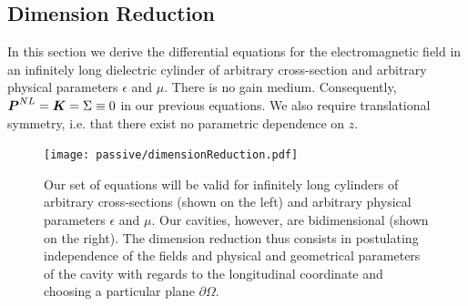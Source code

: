 \subsection{Dimension Reduction}
In this section we derive the differential equations 
for the electromagnetic field in an infinitely long
dielectric cylinder of arbitrary cross-section and arbitrary
physical parameters $\epsilon$ and $\mu$. There is no gain medium.
Consequently, $\boldsymbol{P}^{NL}=\boldsymbol{K}=\Sigma\equiv0$ in our previous equations.
We also require translational symmetry, i.e. that there exist no parametric dependence
on $z$.

\begin{figure}
 \centering
 \texttt{[image: passive/dimensionReduction.pdf]}
 \caption[Schematic view of the reduction of Maxwell's equations from 3D to 2D]
	 {Our set of equations will be valid for infinitely long cylinders of
	  arbitrary cross-sections (shown on the left) and arbitrary physical parameters
	  $\epsilon$ and $\mu$. Our cavities, however, are bidimensional (shown on the right). 
	  The dimension reduction thus consists in postulating independence of the fields
	  and physical and geometrical parameters of the cavity with regards to the longitudinal coordinate 
	  and choosing a particular plane $\partial\Omega$.}
\end{figure}

